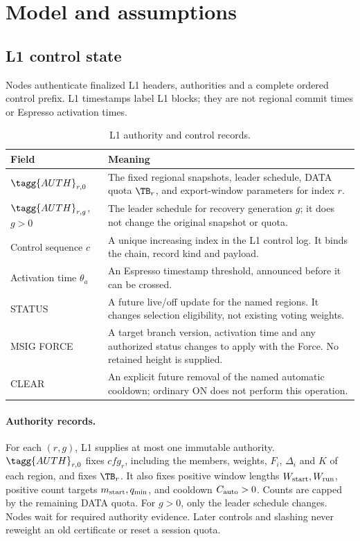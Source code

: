 \section{Model and assumptions}
\label{sec:model}
\subsection{L1 control state}
\label{sec:l1}
Nodes authenticate finalized L1 headers, authorities and a complete
ordered control prefix. L1 timestamps label L1 blocks; they are not
regional commit times or Espresso activation times.

\begin{table}[htbp]\centering\small
\caption{L1 authority and control records.}\label{tab:l1}
\begin{tabularx}{\linewidth}{@{}p{.27\linewidth}Y@{}}\toprule
Field & Meaning\\\midrule
$\tagg{AUTH}_{r,0}$ & The fixed regional snapshots, leader schedule,
DATA quota $\TB_r$, and export-window parameters for index $r$.\\
$\tagg{AUTH}_{r,g}$, $g>0$ & The leader schedule for recovery
generation $g$; it does not change the original snapshot or quota.\\
Control sequence $c$ & A unique increasing index in the L1 control
log. It binds the chain, record kind and payload.\\
Activation time $\theta_a$ & An Espresso timestamp threshold,
announced before it can be crossed.\\
STATUS & A future live/off update for the named regions. It changes
selection eligibility, not existing voting weights.\\
MSIG FORCE & A target branch version, activation time and any authorized
status changes to apply with the Force. No retained height is supplied.\\
CLEAR & An explicit future removal of the named automatic cooldown;
ordinary ON does not perform this operation.\\\bottomrule
\end{tabularx}
\end{table}

\paragraph{Authority records.}
For each $(r,g)$, L1 supplies at most one immutable authority.
$\tagg{AUTH}_{r,0}$ fixes $\mathit{cfg}_r$, including the members,
weights, $F_i$, $\Delta_i$ and $K$ of each region, and fixes $\TB_r$.
It also fixes positive window lengths $W_{\rm start},W_{\rm run}$,
positive count targets $m_{\rm start},q_{\min}$, and cooldown
$C_{\rm auto}>0$. Counts are capped by the remaining DATA quota.
For $g>0$, only the leader schedule changes.
Nodes wait for required authority evidence. Later controls and slashing
never reweight an old certificate or reset a session quota.

